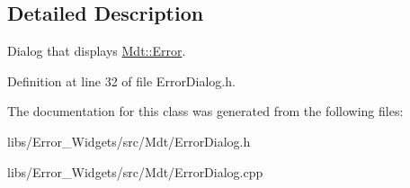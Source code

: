 \subsection{Detailed Description}
Dialog that displays \hyperlink{class_mdt_1_1_error}{Mdt\+::\+Error}. 

Definition at line 32 of file Error\+Dialog.\+h.



The documentation for this class was generated from the following files\+:\begin{DoxyCompactItemize}
\item 
libs/\+Error\+\_\+\+Widgets/src/\+Mdt/Error\+Dialog.\+h\item 
libs/\+Error\+\_\+\+Widgets/src/\+Mdt/Error\+Dialog.\+cpp\end{DoxyCompactItemize}
